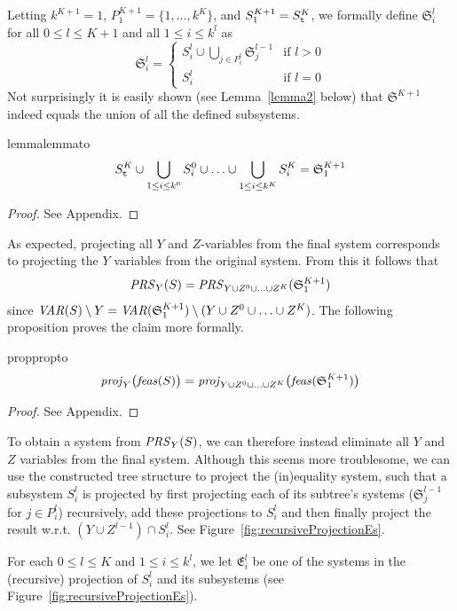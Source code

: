 Letting $k^{K+1}=1$, $P^{K+1}_1 = \{1,\ldots, k^K\}$, and $S^{K+1}_1 = S^K_{\texttt{t}}$, we formally define $\mathfrak{S}^l_i$ for all $0 \leq l \leq K+1$ and all $1\leq i \leq k^l$ as
\[
\mathfrak{S}^l_i = \left\{\begin{array}{ll}
		S^l_i \cup\bigcup_{j\in P^l_i}\mathfrak{S}^{l-1}_j&\text{if }l>0\\
		S^l_i&\text{if } l=0
\end{array}\right.
\]
Not surprisingly it is easily shown (see Lemma~\ref{lemma2} below) that $\mathfrak{S}^{K+1}$ indeed equals the union of all the defined subsystems.
\begin{restatable}{lemma}{lemmato}\label{lemma2}
\[
S^K_{\texttt{t}}\cup\bigcup_{1\leq i\leq k^0}S^0_i\cup\ldots\cup\bigcup_{1\leq i\leq k^K} S^K_i = \mathfrak{S}^{K+1}_1
\]
\end{restatable}
\begin{proof}
See Appendix.
\end{proof}
%
\noindent As expected, projecting all $Y$ and $Z$-variables from the final system corresponds to projecting the $Y$ variables from the original system. From this it follows that 
\begin{equation}\label{eq:projYZ}
\mathit{PRS}_Y(S) = \mathit{PRS}_{Y\cup Z^0\cup \ldots \cup Z^K}(\mathfrak{S}^{K+1}_1)
\end{equation}
since $\mathit{VAR}(S)\setminus Y = \mathit{VAR}(\mathfrak{S}^{K+1}_1)\setminus(Y\cup Z^0\cup \ldots \cup Z^K)$. 
The following proposition proves the claim more formally.
\begin{restatable}{prop}{propto}\label{prop:2}
\[
\mathit{proj}_Y\big(\mathit{feas}(S)\big) = \mathit{proj}_{Y\cup Z^0\cup \ldots \cup Z^K}\big(\mathit{feas}(\mathfrak{S}^{K+1}_1)\big) 
\]
\end{restatable}
\begin{proof}
See Appendix.
\end{proof}
%
\noindent To obtain a system from $\mathit{PRS}_Y(S)$, we can therefore instead eliminate all $Y$ and $Z$ variables from the final system. Although this seems more troublesome, we can use the constructed tree structure to project the (in)equality system, such that a subsystem $S^l_i$ is projected by first projecting each of its subtree's systems ($\mathfrak{S}^{l-1}_j$ for $j\in P^l_i$) recursively, add these projections to $S^l_i$ and then finally project the result w.r.t. $(Y\cup Z^{l-1})\cap S^l_i$. See Figure~\ref{fig:recursiveProjectionEs}.

For each $0\leq l\leq K$ and $1\leq i \leq k^l$, we let $\mathfrak{E}^l_i$ be one of the systems in the (recursive) projection of $S^l_i$ and its subsystems (see Figure~\ref{fig:recursiveProjectionEs}). 


